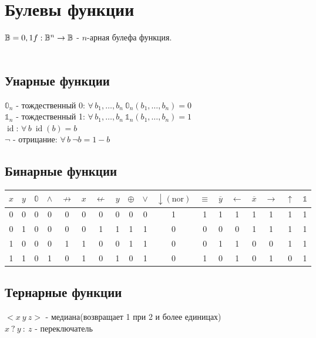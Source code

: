 \documentclass[12pt]{article}
\begin{document}
\section{Булевы функции}
$\mathbb{B} = {0,1}\\
f: \mathbb{B}^n \rightarrow \mathbb{B}$ - $n$-арная булефа функция.\\\\
\subsection{Унарные функции}
$\mathbb{0}_n$ - тождественный 0: $\forall\,b_1,\ldots,b_n\ \mathbb{0}_n(b_1,\ldots,b_n) = 0$\\
$\mathbb{1}_n$ - тождественный 1: $\forall\,b_1,\ldots,b_n\ \mathbb{1}_n(b_1,\ldots,b_n) = 1$ \\
$\operatorname{id}$: $\forall\,b\ \operatorname{id}(b) = b$ \\
$\lnot$ - отрицание: $\forall\,b\ \lnot b = 1-b$
\subsection{Бинарные функции}
\begin{center}
    \begin{tabular}{c c| c c c c c c c c c c c c c c c c}
        $x$ & $y$ & $\mathbb{0}$ & $\land$ & $\nrightarrow$ & $x$ & $\nleftarrow$ & $y$ & $\oplus$ & $\lor$ & $\downarrow(\text{nor})$ & $\equiv$ & $\overline{y}$ & $\leftarrow$ & $\overline{x}$ & $\rightarrow$ & $\uparrow$ & $\mathbb{1}$\\
        \hline
        0 & 0 & 0 & 0 & 0 & 0 & 0 & 0 & 0 & 0 & 1 & 1 & 1 & 1 & 1 & 1 & 1 & 1\\
        0 & 1 & 0 & 0 & 0 & 0 & 1 & 1 & 1 & 1 & 0 & 0 & 0 & 0 & 1 & 1 & 1 & 1\\
        1 & 0 & 0 & 0 & 1 & 1 & 0 & 0 & 1 & 1 & 0 & 0 & 1 & 1 & 0 & 0 & 1 & 1\\
        1 & 1 & 0 & 1 & 0 & 1 & 0 & 1 & 0 & 1 & 0 & 1 & 0 & 1 & 0 & 1 & 0 & 1\\
    \end{tabular}
\end{center}

\subsection{Тернарные функции}
$<x\ y\ z>$ - медиана(возвращает 1 при 2 и более единицах)\\
$x\ ?\ y\ :\ z$ - переключатель
\end{document}
